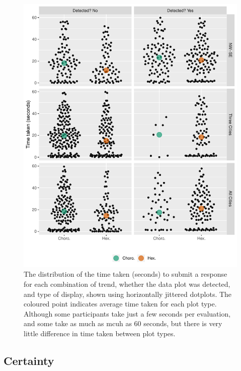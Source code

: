 \documentclass[conference,final,]{IEEEtran}
\makeatletter
\def\maxwidth{\ifdim\Gin@nat@width>\linewidth\linewidth
\else\Gin@nat@width\fi}
\let\Oldincludegraphics\includegraphics
\renewcommand{\includegraphics}[1]{\Oldincludegraphics[width=\maxwidth]{#1}}
\makeatother
\begin{document}
\begin{figure}
\centering
\includegraphics{paper_files/figure-latex/beeswarm-1.pdf}
\caption{\label{fig:beeswarm}The distribution of the time taken (seconds) to submit a response for each combination of trend, whether the data plot was detected, and type of display, shown using horizontally jittered dotplots. The coloured point indicates average time taken for each plot type. Although some participants take just a few seconds per evaluation, and some take as much as mcuh as 60 seconds, but there is very little difference in time taken between plot types.}
\end{figure}

\hypertarget{certainty}{%
\subsection{Certainty}\label{certainty}}
\end{document}
